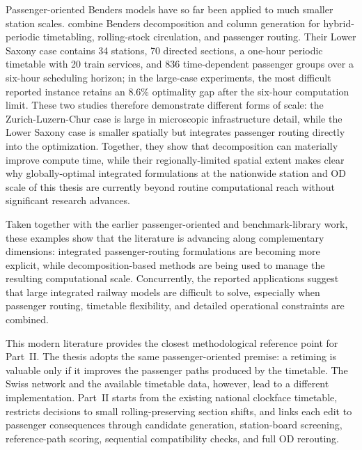 \documentclass[preprint,12pt]{elsarticle}
\begin{document}
Passenger-oriented Benders models have so far been applied to much smaller station scales. \citet{yaoEtAl2025HybridBenders} combine Benders decomposition and column generation for hybrid-periodic timetabling, rolling-stock circulation, and passenger routing. Their Lower Saxony case contains 34 stations, 70 directed sections, a one-hour periodic timetable with 20 train services, and 836 time-dependent passenger groups over a six-hour scheduling horizon; in the large-case experiments, the most difficult reported instance retains an 8.6\% optimality gap after the six-hour computation limit. These two studies therefore demonstrate different forms of scale: the Zurich-Luzern-Chur case is large in microscopic infrastructure detail, while the Lower Saxony case is smaller spatially but integrates passenger routing directly into the optimization. Together, they show that decomposition can materially improve compute time, while their regionally-limited spatial extent makes clear why globally-optimal integrated formulations at the nationwide station and OD scale of this thesis are currently beyond routine computational reach without significant research advances.

Taken together with the earlier passenger-oriented and benchmark-library work, these examples show that the literature is advancing along complementary dimensions: integrated passenger-routing formulations are becoming more explicit, while decomposition-based methods are being used to manage the resulting computational scale. Concurrently, the reported applications suggest that large integrated railway models are difficult to solve, especially when passenger routing, timetable flexibility, and detailed operational constraints are combined. 

This modern literature provides the closest methodological reference point for Part~II. The thesis adopts the same passenger-oriented premise: a retiming is valuable only if it improves the passenger paths produced by the timetable. The Swiss network and the available timetable data, however, lead to a different implementation. Part~II starts from the existing national clockface timetable, restricts decisions to small rolling-preserving section shifts, and links each edit to passenger consequences through candidate generation, station-board screening, reference-path scoring, sequential compatibility checks, and full OD rerouting.
\end{document}
